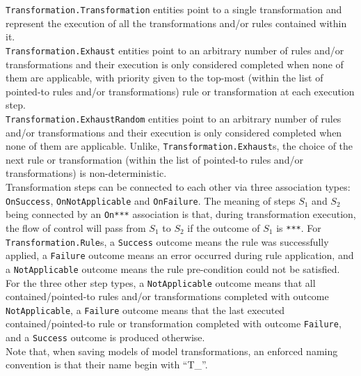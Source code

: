 \documentclass{article}
\numberwithin{equation}{section}
\numberwithin{figure}{section}
\begin{document}
\texttt{Transformation.Transformation} entities point to a single transformation and represent the execution of all the transformations and/or rules contained within it.\\

\texttt{Transformation.Exhaust} entities point to an arbitrary number of rules and/or transformations and their execution is only considered completed when none of them are applicable, with priority given to the top-most (within the list of pointed-to rules and/or transformations) rule or transformation at each execution step.\\

\texttt{Transformation.ExhaustRandom} entities point to an arbitrary number of rules and/or transformations and their execution is only considered completed when none of them are applicable. Unlike, \texttt{Transformation.Exhaust}s, the choice of the next rule or transformation (within the list of pointed-to rules and/or transformations) is non-deterministic.\\

Transformation steps can be connected to each other via three association types: \texttt{OnSuccess}, \texttt{OnNotApplicable} and \texttt{OnFailure}. The meaning of steps $S_1$ and $S_2$ being connected by an \texttt{On***} association is that, during transformation execution, the flow of control will pass from $S_1$ to $S_2$ if the outcome of $S_1$ is \texttt{***}. For \texttt{Transformation.Rule}s, a \texttt{Success} outcome means the rule was successfully applied, a \texttt{Failure} outcome means an error occurred during rule application, and a \texttt{NotApplicable} outcome means the rule pre-condition could not be satisfied. For the three other step types, a \texttt{NotApplicable} outcome means that all contained/pointed-to rules and/or transformations completed with outcome \texttt{NotApplicable}, a \texttt{Failure} outcome means that the last executed contained/pointed-to rule or transformation completed with outcome \texttt{Failure}, and a \texttt{Success} outcome is produced otherwise.\\

Note that, when saving models of model transformations, an enforced naming convention is that their name begin with ``T\_''.



\end{document}

